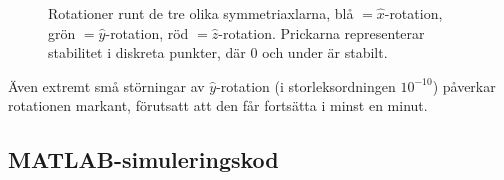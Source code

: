 \documentclass[12pt,a4paper]{article}
\begin{document}
\begin{figure}
\begin{center}
				\hspace{12pt}
			\end{center}
			\caption{Rotationer runt de tre olika symmetriaxlarna, blå $=\hat{x}$-rotation, grön $=\hat{y}$-rotation,
			röd $=\hat{z}$-rotation. Prickarna representerar stabilitet i diskreta punkter, där 0 och under är stabilt.}
		\end{figure}
		
		Även extremt små störningar av $\hat{y}$-rotation (i storleksordningen $10^{-10}$) påverkar rotationen markant,
		förutsatt att den får fortsätta i minst en minut.
		
\pagebreak

\begin{appendix}
	\section{MATLAB-simuleringskod}
	
		
		
		\begin{framed}
			
		\end{framed}
		
\end{appendix}
\end{document}
